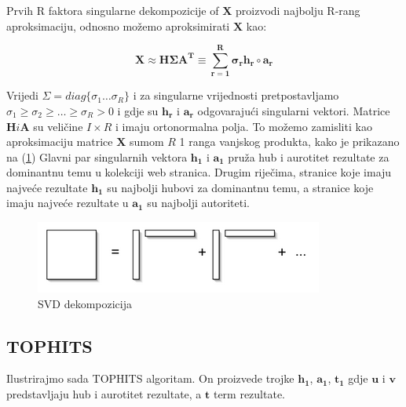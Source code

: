 \documentclass[11pt]{article}
\begin{document}
\begin{flushleft}
Prvih R faktora singularne dekompozicije of $\boldsymbol{X}$ proizvodi najbolju R-rang aproksimaciju, odnosno možemo aproksimirati $\boldsymbol{X}$ kao:
\end{flushleft}
\begin{equation}
    \boldsymbol{X \approx H \Sigma A^{T} \equiv \sum_{r = 1}^{R} \sigma_{r} h_{r} \circ a_{r}}
\end{equation}

\begin{raggedleft}
Vrijedi $\Sigma = diag\{\sigma_{1} \ldots \sigma_{R}\}$ i za singularne vrijednosti pretpostavljamo $\sigma_{1} \ge \sigma_{2} \ge \ldots \ge \sigma_{R} > 0 $ i gdje su $\boldsymbol{h_r}$ i $\boldsymbol{a_r}$ odgovarajući singularni vektori. Matrice $\boldsymbol{H} i  \boldsymbol{A}$ su veličine $I \times R$ i imaju ortonormalna polja. To možemo zamisliti kao aproksimaciju matrice $\boldsymbol{X}$ sumom $R$ 1 ranga vanjskog produkta, kako je prikazano na  (\ref{figure:2}) Glavni par singularnih vektora $\boldsymbol{h_1}$ i $\boldsymbol{a_1}$ pruža hub i aurotitet rezultate za dominantnu temu u kolekciji web stranica. Drugim riječima, stranice koje imaju najveće rezultate $\boldsymbol{h_1}$ su najbolji hubovi za dominantnu temu, a stranice koje imaju najveće rezultate u $\boldsymbol{a_1}$ su najbolji autoriteti. 
\end{raggedleft}

\begin{figure}[hbt!]
    \centering
    \includegraphics[width= \textwidth]{svd.png}  
    \caption{SVD dekompozicija}
    \label{figure:2}
\end{figure}

\newpage
\subsection{TOPHITS}
\begin{flushleft}
Ilustrirajmo sada TOPHITS algoritam. On proizvede trojke 
$\boldsymbol{h_1}$,  $\boldsymbol{a_1}$, $\boldsymbol{t_1}$  gdje $\boldsymbol{u}$ i $\boldsymbol{v}$ predstavljaju hub i aurotitet rezultate, a $\boldsymbol{t}$  term rezultate.
\end{flushleft}
\end{document}
